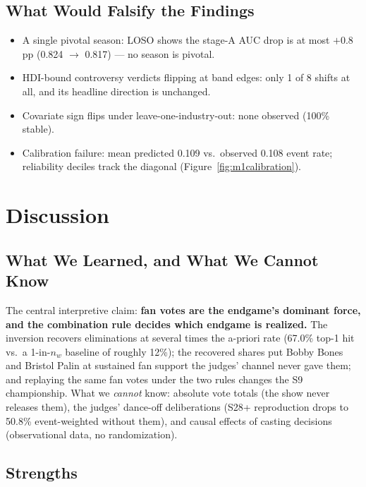 \documentclass[10pt]{article}
\begin{document}
\subsection{What Would Falsify the Findings}

\begin{itemize}[itemsep=1pt]
\item A single pivotal season: LOSO shows the stage-A AUC drop is at most $+0.8$\,pp
(0.824 $\to$ 0.817) --- no season is pivotal.
\item HDI-bound controversy verdicts flipping at band edges: only 1 of 8 shifts at all,
and its headline direction is unchanged.
\item Covariate sign flips under leave-one-industry-out: none observed (100\% stable).
\item Calibration failure: mean predicted 0.109 vs.\ observed 0.108 event rate;
reliability deciles track the diagonal (Figure~\ref{fig:m1calibration}).
\end{itemize}

\section{Discussion}
\label{sec:discussion}

\subsection{What We Learned, and What We Cannot Know}

The central interpretive claim: \textbf{fan votes are the endgame's dominant force, and
the combination rule decides which endgame is realized.} The inversion recovers
eliminations at several times the a-priori rate (67.0\% top-1 hit vs.\ a 1-in-$n_w$
baseline of roughly 12\%); the recovered shares put Bobby Bones and Bristol Palin at
sustained fan support the judges' channel never gave them; and replaying the same fan
votes under the two rules changes the S9 championship. What we \emph{cannot} know:
absolute vote totals (the show never releases them), the judges' dance-off deliberations
(S28+ reproduction drops to 50.8\% event-weighted without them), and causal effects of
casting decisions (observational data, no randomization).

\subsection{Strengths}
\end{document}
